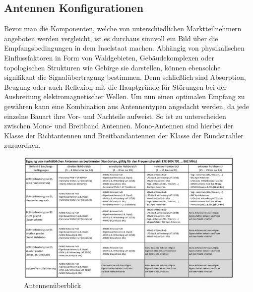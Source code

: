 	\subsection{Antennen Konfigurationen}
	\label{subsec:Antennen Konfigurationen}
Bevor man die Komponenten, welche von unterschiedlichen Marktteilnehmern angeboten werden vergleicht, ist es durchaus sinnvoll ein Bild über die Empfangsbedingungen in dem Inselstaat machen. Abhängig von physikalischen Einflussfaktoren in Form von Waldgebieten, Gebäudekomplexen oder topologischen Strukturen wie Gebirge sie darstellen, können ebensolche signifikant die Signalübertragung bestimmen. Denn schließlich sind Absorption, Beugung oder auch Reflexion mit die Hauptgründe für Störungen bei der Ausbreitung elektromagnetischer Wellen. Um nun einen optimalen Empfang zu gewähren kann eine Kombination aus Antennentypen angedacht werden, da jede einzelne Bauart ihre Vor- und Nachteile aufweist. So ist zu unterscheiden zwischen Mono- und Breitband Antennen. Mono-Antennen sind hierbei der Klasse der Richtantennen und Breitbandantennen der Klasse der Rundstrahler zuzuordnen. \cite{Sch19}
\begin{figure}[ht]
	\centering
	\includegraphics[width=1\linewidth]{images/tabellemcnantennen}
	\caption{Antennenüberblick  \protect\cite{Sch19}}
	\label{fig:tabellemcnantennen}
\end{figure}


\raggedbottom 

